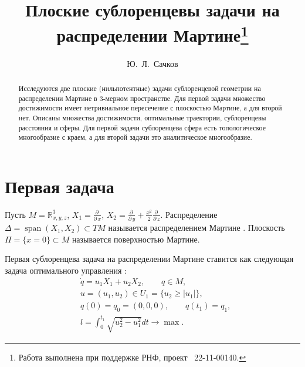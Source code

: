 \title{Плоские сублоренцевы задачи на  распределении Мартине\thanks{Работа выполнена при поддержке  РНФ, проект \textnumero~22-11-00140.}}
\author{Ю.~Л.~Сачков
}


\maketitle

\begin{abstract}
Исследуются две плоские (нильпотентные) задачи сублоренцевой геометрии  на
распределении Мартине в 3-мерном пространстве. Для первой задачи множество достижимости имеет
нетривиальное пересечение с плоскостью Мартине, а для второй нет.
Описаны множества достижимости, оптимальные траектории, сублоренцевы
расстояния и сферы. Для первой задачи сублоренцева сфера есть топологическое 
многообразие с краем, а для второй задачи это аналитическое многообразие.


\end{abstract}


\section{Первая задача}
Пусть $M = {\mathbb R}^3_{x, y, z}$, $X_1 = \frac{\partial \,  }{\partial \, x}$, $X_2 = \frac{\partial \,  }{\partial \, y} + \frac{x^2}{2} \frac{\partial \,  }{\partial \, z}$. Распределение $\Delta = \operatorname{span}\nolimits(X_1, X_2)\subset TM$  называется распределением Мартине \cite{mont_book,ABCK,ABB,UMN2}. Плоскость $\Pi = \{x=0\}\subset M$ называется поверхностью Мартине. 

Первая сублоренцева задача на распределении Мартине ставится как следующая задача оптимального управления \cite{notes,intro}:
\begin{align}
&\dot q = u_1 X_1 + u_2 X_2, \qquad q \in M, \label{pr11} \\
&u= (u_1, u_2) \in U_1 = \{u_2 \geq |u_1|\}, \label{pr12}\\
&q(0) = q_0 = (0, 0, 0), \qquad q(t_1) = q_1, \label{pr13}\\
&l = \int_0^{t_1} \sqrt{u_2^2-u_1^2}dt \to \max. \label{pr14}
\end{align}

